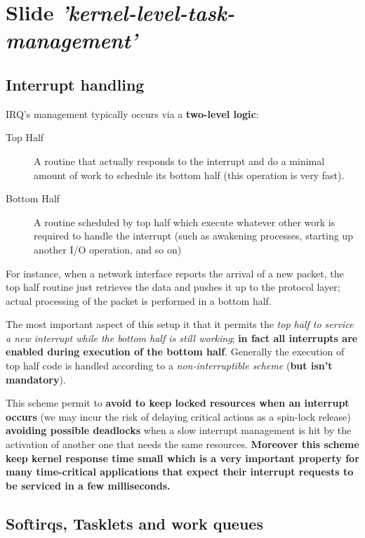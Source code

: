 \documentclass[10pt,a4paper]{article}
\begin{document}
\newpage
\section{Slide \textit{'kernel-level-task-management'}}









\subsection{Interrupt handling}



IRQ's management typically occurs via a \textbf{two-level logic}:
\begin{description}
\item[Top Half] A routine that actually responds to the interrupt and do a minimal amount of work to schedule its bottom half (this operation is very fast).
\item[Bottom Half] A routine scheduled by top half which execute whatever other work is required to handle the interrupt (such as awakening processes, starting up another I/O operation, and so on)
\end{description}

For instance, when a network interface reports the arrival of a new packet, the top half routine just retrieves the data and pushes it up to the protocol layer; actual processing of the packet is performed in a bottom half.

The most important aspect of this setup it that it permits the \textit{top half to service a new interrupt while the bottom half is still working}; \textbf{in fact all interrupts are enabled during execution of the bottom half}. Generally the execution of top half code is handled according to a \textit{non-interruptible scheme} (\textbf{but isn't mandatory}). 

This scheme permit to \textbf{avoid to keep locked resources when an interrupt occurs} (we may incur the risk of delaying critical actions as a spin-lock release) \textbf{avoiding possible deadlocks} when a slow interrupt management is hit by the activation of another one that needs the same resources. \textbf{Moreover this scheme keep
kernel response time small which is a very important property for many time-critical applications that expect their interrupt requests to be serviced in a few milliseconds.}

\subsection{Softirqs, Tasklets and work queues}
\end{document}
